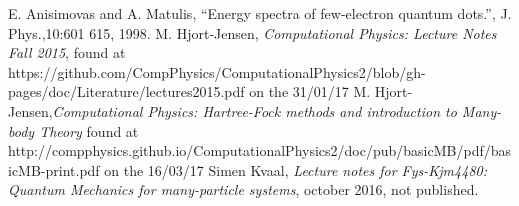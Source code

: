 \documentclass[a4paper,english,12pt]{article}
\begin{document}
\begin{thebibliography}{1}


  E. Anisimovas and A. Matulis, ``Energy spectra of few-electron quantum dots.'', J. Phys.,10:601 615, 1998.
  M. Hjort-Jensen, \emph{Computational Physics: Lecture Notes Fall 2015}, found at
  https://github.com/CompPhysics/ComputationalPhysics2/blob/gh-pages/doc/Literature/lectures2015.pdf
  on the 31/01/17
  M. Hjort-Jensen,\emph{Computational Physics: Hartree-Fock methods and introduction to Many-body Theory}
  found at http://compphysics.github.io/ComputationalPhysics2/doc/pub/basicMB/pdf/basicMB-print.pdf
  on the 16/03/17
  Simen Kvaal, \emph{Lecture notes for Fys-Kjm4480: Quantum Mechanics for many-particle systems},
  october 2016, not published.
\end{thebibliography}



      
      




\end{document}
